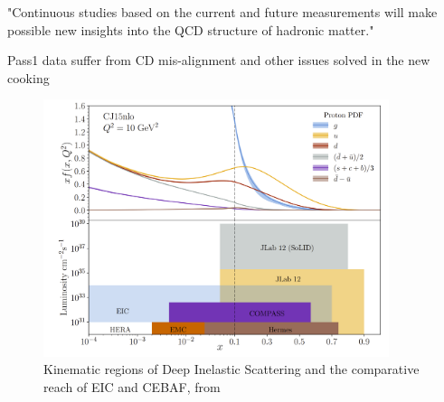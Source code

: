  "Continuous
studies based on the current and future measurements will make possible new insights
into the QCD structure of hadronic matter."


Pass1 data suffer from CD mis-alignment and other issues solved in the new cooking

\begin{figure}
    \centering
    \includegraphics[width=0.9\textwidth]{Chapters/Ch5-Further/conclusion/pics/future.png}
    \caption{Kinematic regions of Deep Inelastic Scattering and the comparative reach of EIC and CEBAF, from \parencite{Arrington2022PhysicsOpportunities} }
    \label{fig:physics_future_ranges}
\end{figure}
